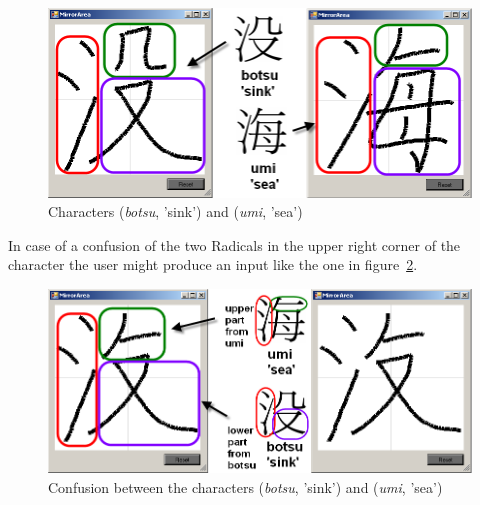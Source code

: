 \begin{figure}[htbp]
  \begin{center}
    \includegraphics[scale=0.75]{images/char935vsChar117HandwrittenMarked.png}
    \caption{Characters  (\emph{botsu}, 'sink') and  (\emph{umi}, 'sea')}
    \label{fig:eval:botsuumiprintvsdrawn}
  \end{center}
\end{figure}
In case of a confusion of the two Radicals in the upper right corner of 
the character the user might produce an input like the one in 
figure~\ref{fig:eval:hybrid935and117}.
\begin{figure}[htbp]
  \begin{center}
    \includegraphics[scale=0.57]{images/char935and117HybridMarked.png}
    \caption{Confusion between the characters  (\emph{botsu}, 'sink') and  (\emph{umi}, 'sea')}
    \label{fig:eval:hybrid935and117}
  \end{center}
\end{figure}

